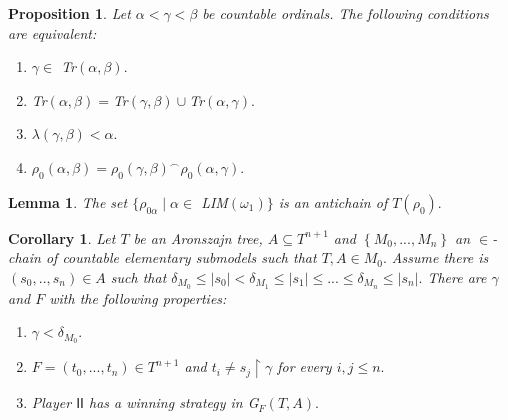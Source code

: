 \documentclass[10pt,a4paper]{amsart}
\newtheorem{proposition}{Proposition}
\newtheorem{lemma}{Lemma}
\newtheorem{corollary}{Corollary}
\begin{document}
\begin{proposition}
Let $\alpha<\gamma<\beta$ be countable ordinals. The following conditions are
equivalent: \label{Prop juntar trazas}

\begin{enumerate}
\item $\gamma\in$ \textsf{Tr}$\left(  \alpha,\beta\right)  .$

\item \textsf{Tr}$\left(  \alpha,\beta\right)  =$\textsf{Tr}$\left(
\gamma,\beta\right)  \cup$\textsf{Tr}$\left(  \alpha,\gamma\right)  .$

\item $\lambda\left(  \gamma,\beta\right)  <\alpha.$

\item $\rho_{0}\left(  \alpha,\beta\right)  =\rho_{0}\left(  \gamma
,\beta\right)  ^{\frown}\rho_{0}\left(  \alpha,\gamma\right)  .$
\end{enumerate}
\end{proposition}

\begin{lemma}
The set $\{\rho_{0\alpha}\mid\alpha\in$ \textsf{LIM}$\left(  \omega
_{1}\right)  \}$ is an antichain of $T\left(  \rho_{0}\right)  .$
\label{Lema limite anticadena}
\end{lemma}

\begin{corollary}
Let $T$ be an Aronszajn tree, $A\subseteq T^{n+1}$ and $\left\{
M_{0},...,M_{n}\right\}  $ an $\in$-chain of countable elementary submodels
such that $T,A\in M_{0}.$ Assume there is $\left(  s_{0},..,s_{n}\right)  \in
A$ such that $\delta_{M_{0}}\leq\left\vert s_{0}\right\vert <\delta_{M_{1}%
}\leq\left\vert s_{1}\right\vert \leq...\leq\delta_{M_{n}}\leq\left\vert
s_{n}\right\vert .$ There are $\gamma$ and $F$ with the following properties:
\label{Corol del juego}

\begin{enumerate}
\item $\gamma<\delta_{M_{0}}.$

\item $F=\left(  t_{0},...,t_{n}\right)  \in T^{n+1}$ and $t_{i}\neq
s_{j}\upharpoonright\gamma$ for every $i,j\leq n.$

\item Player $\mathsf{II}$ has a winning strategy in \emph{G}$_{F}\left(
T,A\right)  .$
\end{enumerate}
\end{corollary}
\end{document}
